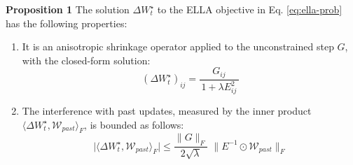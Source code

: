 \textbf{Proposition 1}
The solution $\Delta W_t^\star$ to the ELLA objective in Eq. \eqref{eq:ella-prob} has the following properties:
\begin{enumerate}
    \item[\textit{(i)}] It is an anisotropic shrinkage operator applied to the unconstrained step $G$, with the closed-form solution:
    \[
    (\Delta W_t^\star)_{ij} = \frac{G_{ij}}{\,1+\lambda E_{ij}^2\,}
    \]
    \item[\textit{(ii)}] The interference with past updates, measured by the inner product $\langle \Delta W_t^\star, \mathcal{W}_{past} \rangle_F$, is bounded as follows:
    \[
    \bigl|\langle \Delta W_t^\star,\mathcal{W}_{past}\rangle_F\bigr|
    \le
    \frac{\|G\|_F}{2\sqrt{\lambda}}\;\|E^{-1}\odot \mathcal{W}_{past}\|_F
    \]
\end{enumerate}



